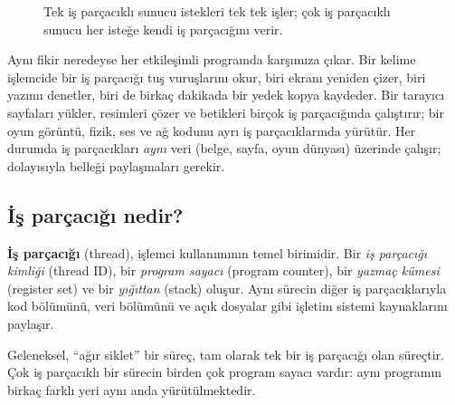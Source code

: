 \documentclass[11pt,a4paper]{article}
\begin{document}
\begin{figure}[H]
\centering
{}
\caption{Tek iş parçacıklı sunucu istekleri tek tek işler; çok iş parçacıklı sunucu her isteğe kendi iş parçacığını verir.}
\end{figure}

Aynı fikir neredeyse her etkileşimli programda karşımıza çıkar. Bir kelime işlemcide bir iş parçacığı tuş vuruşlarını okur, biri ekranı yeniden çizer, biri yazımı denetler, biri de birkaç dakikada bir yedek kopya kaydeder. Bir tarayıcı sayfaları yükler, resimleri çözer ve betikleri birçok iş parçacığında çalıştırır; bir oyun görüntü, fizik, ses ve ağ kodunu ayrı iş parçacıklarında yürütür. Her durumda iş parçacıkları \emph{aynı} veri (belge, sayfa, oyun dünyası) üzerinde çalışır; dolayısıyla belleği paylaşmaları gerekir.

\subsection{İş parçacığı nedir?}

\begin{keyidea}[Tanım]
\textbf{İş parçacığı} (thread), işlemci kullanımının temel birimidir. Bir \emph{iş parçacığı kimliği} (thread ID), bir \emph{program sayacı} (program counter), bir \emph{yazmaç kümesi} (register set) ve bir \emph{yığıttan} (stack) oluşur. Aynı sürecin diğer iş parçacıklarıyla kod bölümünü, veri bölümünü ve açık dosyalar gibi işletim sistemi kaynaklarını paylaşır.
\end{keyidea}

Geleneksel, ``ağır siklet'' bir süreç, tam olarak tek bir iş parçacığı olan süreçtir. Çok iş parçacıklı bir sürecin birden çok program sayacı vardır: aynı programın birkaç farklı yeri aynı anda yürütülmektedir.
\end{document}
